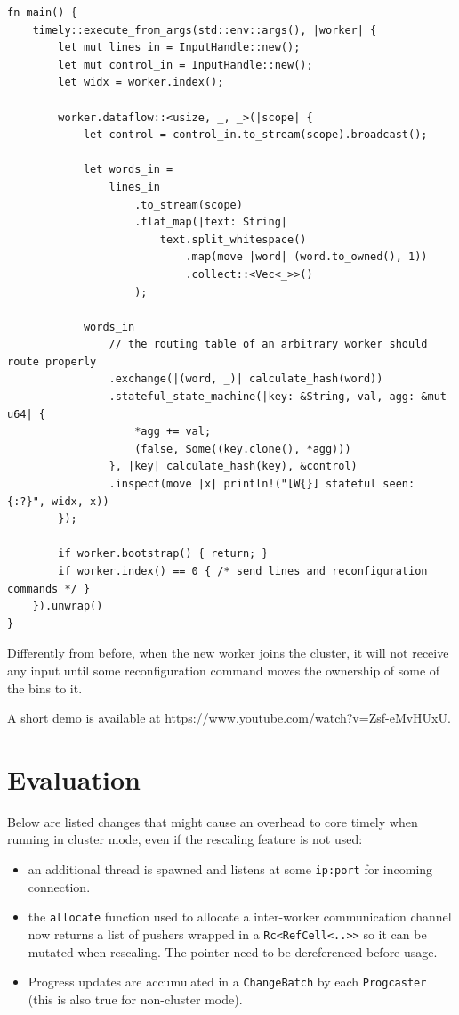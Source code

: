 \documentclass[12pt]{extarticle}
\begin{document}
\begin{verbatim}
fn main() {
    timely::execute_from_args(std::env::args(), |worker| {
        let mut lines_in = InputHandle::new();
        let mut control_in = InputHandle::new();
        let widx = worker.index();

        worker.dataflow::<usize, _, _>(|scope| {
            let control = control_in.to_stream(scope).broadcast();

            let words_in =
                lines_in
                    .to_stream(scope)
                    .flat_map(|text: String|
                        text.split_whitespace()
                            .map(move |word| (word.to_owned(), 1))
                            .collect::<Vec<_>>()
                    );

            words_in
                // the routing table of an arbitrary worker should route properly
                .exchange(|(word, _)| calculate_hash(word))
                .stateful_state_machine(|key: &String, val, agg: &mut u64| {
                    *agg += val;
                    (false, Some((key.clone(), *agg)))
                }, |key| calculate_hash(key), &control)
                .inspect(move |x| println!("[W{}] stateful seen: {:?}", widx, x))
        });

        if worker.bootstrap() { return; }
        if worker.index() == 0 { /* send lines and reconfiguration commands */ }
    }).unwrap()
}
\end{verbatim}


Differently from before, when the new worker joins the cluster, it will not receive any input until
some reconfiguration command moves the ownership of some of the bins to it.

A short demo is available at \url{https://www.youtube.com/watch?v=Zsf-eMvHUxU}.



\section{Evaluation}

Below are listed changes that might cause an overhead to core timely when running in cluster mode, even if the rescaling feature is not used:

\begin{itemize}
    \item an additional thread is spawned and listens at some \verb|ip:port| for incoming connection.
    \item the \verb|allocate| function used to allocate a inter-worker communication channel now returns a list of pushers wrapped in a \verb|Rc<RefCell<..>>| so it can be mutated when rescaling.
        The pointer need to be dereferenced before usage.
    \item Progress updates are accumulated in a \verb|ChangeBatch| by each \verb|Progcaster| (this is also true for non-cluster mode).
\end{itemize}
\end{document}

